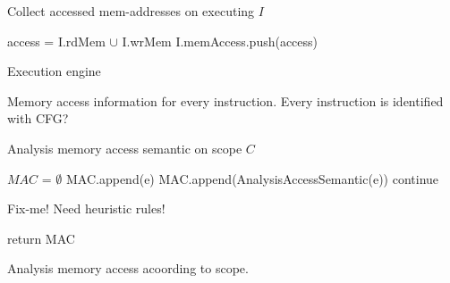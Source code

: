 \begin{algorithm}
  \caption{Collect accessed mem-addresses on executing $I$}
  \footnotesize
  \begin{algorithmic}[1]

     
    \State access = I.rdMem $\cup$ I.wrMem
    \State I.memAccess.push(access)

    \EndFunction
  \end{algorithmic}
\end{algorithm}


Execution engine

Memory access information for every instruction.
Every instruction is identified with CFG?


\begin{algorithm}
  \caption{Analysis memory access semantic on scope $C$}
  \footnotesize
  \begin{algorithmic}[1]

    \State $MAC$ = $\emptyset$
    \State MAC.append(e)
    \State MAC.append(AnalysisAccessSemantic(e))
    \Else
    \State continue
    \EndIf
    \EndFor

    \State
    \State Fix-me! Need heuristic rules!

    \State
    \State return MAC
    \EndFunction
  \end{algorithmic}
\end{algorithm}






Analysis memory access acoording to scope.



